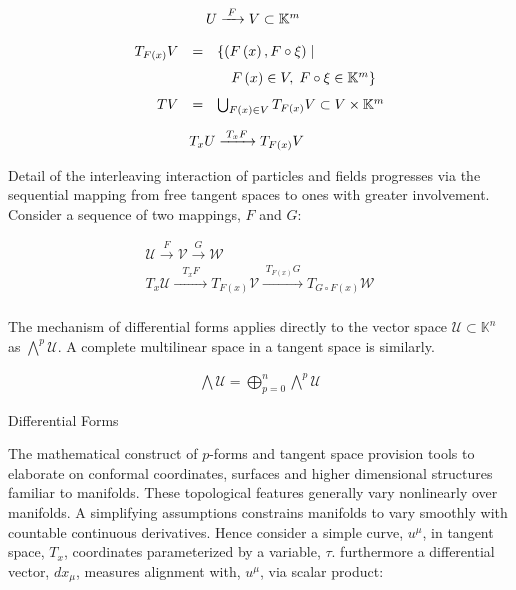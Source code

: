\documentclass[aps,twocolumn,secnumarabic,nobalancelastpage,amsmath,amssymb,
amsthm,nofootinbib,parskip=full]{revtex4}
\numberwithin{equation}{section}
\newcommand{\mapaob}[3]{{#1}\xrightarrow{\;{#2}\;}{#3}}
\newcommand{\pa}[1]{\left(#1\right)}
\begin{document}
\begin{equation*}
\begin{array}{rcl}
&&\hspace{-8pt}\mapaob{\mathscr{U}}{F}{\mathscr{V}}\subset\mathbb{K}^m \\[11pt]
T_{F\pa{x}}\mathscr{V}&=&\{\pa{F\pa{x},F\circ\xi}\mid \\[7pt]
                          &&\quad F\pa{x}\in\mathscr{V},\;
                  F\circ\xi\in \mathbb{K}^m\} \\[7pt]
T\mathscr{V}&=&\bigcup_{F\pa{x}\in\mathscr{V}} T_{F\pa{x}}\mathscr{V}
  \subset\mathscr{V}\times\mathbb{K}^m \\[11pt]
&&\hspace{-20pt}\mapaob{T_x\mathscr{U}}{T_xF}{T_{F\pa{x}}\mathscr{V}}
\end{array}
\end{equation*}

Detail of the interleaving interaction of particles and fields
progresses via the sequential mapping from free tangent spaces to
ones with greater involvement. Consider a sequence of two mappings,
$F$ and $G$:

\begin{equation*}
\begin{array}{c}
\mapaob{\mathscr{U}}{F}{\mapaob{\mathscr{V}}{G}{\mathscr{W}}} \\[11pt]
\mapaob{T_x\mathscr{U}}{\;\;T_xF\;\;}{
  \mapaob{T_{F\pa{x}}\mathscr{V}}
  {T_{F\pa{x}}G}{T_{G\circ F\pa{x}}\mathscr{W}}} \\[11pt]
\end{array}
\end{equation*}

The mechanism of differential forms applies directly to the vector space
$\mathscr{U}\subset\mathbb{K}^n$ as ${\bigwedge}^p\mathscr{U}$.
A complete multilinear space in a tangent space is similarly.

\begin{equation*}
\begin{array}{rcl}
\bigwedge\mathscr{U}=\bigoplus^n_{p=0}{\bigwedge}^p\mathscr{U}
\end{array}
\end{equation*}

Differential Forms

The mathematical construct of $p$-forms and tangent space provision tools
to elaborate on conformal coordinates, surfaces and higher dimensional
structures familiar to manifolds.
These topological features generally vary nonlinearly
over manifolds. A simplifying assumptions constrains manifolds to vary
smoothly with countable continuous derivatives.
Hence consider a simple curve, $u^\mu$, in tangent space, $T_x$, coordinates
parameterized by a variable, $\tau$. furthermore a differential vector,
$dx_\mu$, measures alignment with, $u^\mu$, via scalar product:
\end{document}

